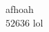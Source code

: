 \documentclass[varwidth, margin=2mm]{standalone}
\begin{document}
afhoah\\
$52636$
lol
\end{document}
